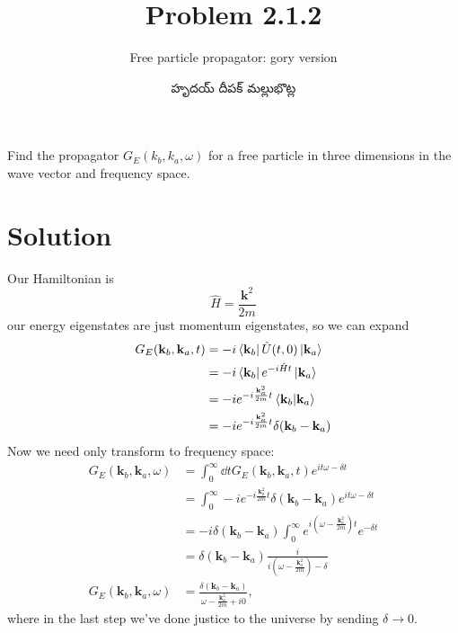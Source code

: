 \documentclass{article}
\title{Problem 2.1.2}
\subtitle{Free particle propagator: gory version}
\author{\begin{telugu}హృదయ్ దీపక్ మల్లుభొట్ల\end{telugu}}
\renewcommand{\vec}[1]{\mathbf{#1}}
\newcommand{\ham}{\hat{H}}
\begin{document}
	\maketitle
	Find the propagator $G_E(k_b, k_a, \omega)$ for a free particle in three dimensions in the wave vector and frequency space.

	\section{Solution} \label{sec:solution}

	Our Hamiltonian is
	\begin{equation}
		\ham = \frac{\vec{k}^2}{2m}
	\end{equation}
	\triv our energy eigenstates are just momentum eigenstates, so we can expand
	\begin{align}
		G_E(\vec{k}_b, \vec{k}_a, t) &= -i \bra{\vec{k}_b} \hat{U}(t, 0) \ket{\vec{k}_a} \\
		&= -i \bra{\vec{k}_b} e^{-i \ham t} \ket{\vec{k}_a} \\
		&= -i e^{-i \frac{\vec{k}_a^2}{2m} t} \bra{\vec{k}_b}\ket{\vec{k}_a} \\
		&= -i e^{-i \frac{\vec{k}_a^2}{2m} t} \delta(\vec{k}_b - \vec{k}_a)
	\end{align}
	Now we need only transform to frequency space:
	\begin{align}
		G_E(\vec{k}_b, \vec{k}_a, \omega) &= \int_0^\infty \dd{t} G_E(\vec{k}_b, \vec{k}_a, t) e^{i t \omega - \delta t} \\
		&= \int_0^\infty -i e^{-i \frac{\vec{k}_a^2}{2m} t} \delta(\vec{k}_b - \vec{k}_a)e^{i t \omega - \delta t} \\
		&= -i \delta(\vec{k}_b - \vec{k}_a) \int_0^\infty e^{i (\omega - \frac{\vec{k}_a^2}{2m}) t} e^{- \delta t} \\
		&= \delta(\vec{k}_b - \vec{k}_a) \frac{i}{i (\omega - \frac{\vec{k}_a^2}{2m}) - \delta}\\
		G_E(\vec{k}_b, \vec{k}_a, \omega) &=  \frac{\delta(\vec{k}_b - \vec{k}_a)}{\omega - \frac{\vec{k}_a^2}{2m} + i 0},
	\end{align}
	where in the last step we've done justice to the universe by sending $\delta \rightarrow 0$.


	\newpage
	\listoftodos
\end{document}
